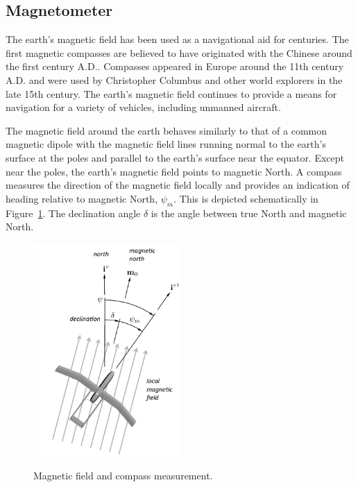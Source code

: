 \subsection{Magnetometer}

The earth's magnetic field has been used as a navigational aid for centuries. The first magnetic compasses are believed to have originated with the Chinese around the first century A.D.. Compasses appeared in Europe around the 11th century A.D. and were used by Christopher Columbus and other world explorers in the late 15th century. The earth's magnetic field continues to provide a means for navigation for a variety of vehicles, including unmanned aircraft.

The magnetic field around the earth behaves similarly to that of a common magnetic dipole with the magnetic field lines running normal to the earth's surface at the poles and parallel to the earth's surface near the equator. Except near the poles, the earth's magnetic field points to magnetic North. A compass measures the direction of the magnetic field locally and provides an indication of heading relative to magnetic North, $\psi_m$. This is depicted schematically in Figure~\ref{fig:sensors-compass}. The declination angle $\delta$ is the angle between true North and magnetic North.

\begin{figure}[htb]
  \centering
  \includegraphics[width=0.5\textwidth]{chap11_attitude_estimation/figures/sensors-compass}\\
  \caption{Magnetic field and compass measurement.}
  \label{fig:sensors-compass}
\end{figure}

